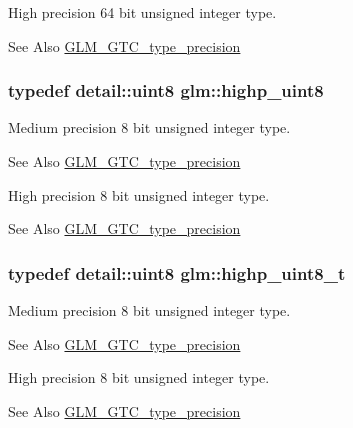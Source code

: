 High precision 64 bit unsigned integer type. \begin{DoxySeeAlso}{See Also}
\hyperlink{group__gtc__type__precision}{G\-L\-M\-\_\-\-G\-T\-C\-\_\-type\-\_\-precision} 
\end{DoxySeeAlso}
\hypertarget{group__gtc__type__precision_ga2c27c6dd26e893786f04b10f99c1ee95}{
\subsubsection[{highp\-\_\-uint8}]{\setlength{\rightskip}{0pt plus 5cm}typedef detail\-::uint8 {\bf glm\-::highp\-\_\-uint8}}}\label{group__gtc__type__precision_ga2c27c6dd26e893786f04b10f99c1ee95}
Medium precision 8 bit unsigned integer type. \begin{DoxySeeAlso}{See Also}
\hyperlink{group__gtc__type__precision}{G\-L\-M\-\_\-\-G\-T\-C\-\_\-type\-\_\-precision}
\end{DoxySeeAlso}
High precision 8 bit unsigned integer type. \begin{DoxySeeAlso}{See Also}
\hyperlink{group__gtc__type__precision}{G\-L\-M\-\_\-\-G\-T\-C\-\_\-type\-\_\-precision} 
\end{DoxySeeAlso}
\hypertarget{group__gtc__type__precision_ga9ba529fcc75b82d23da979f0ce6e4518}{
\subsubsection[{highp\-\_\-uint8\-\_\-t}]{\setlength{\rightskip}{0pt plus 5cm}typedef detail\-::uint8 {\bf glm\-::highp\-\_\-uint8\-\_\-t}}}\label{group__gtc__type__precision_ga9ba529fcc75b82d23da979f0ce6e4518}
Medium precision 8 bit unsigned integer type. \begin{DoxySeeAlso}{See Also}
\hyperlink{group__gtc__type__precision}{G\-L\-M\-\_\-\-G\-T\-C\-\_\-type\-\_\-precision}
\end{DoxySeeAlso}
High precision 8 bit unsigned integer type. \begin{DoxySeeAlso}{See Also}
\hyperlink{group__gtc__type__precision}{G\-L\-M\-\_\-\-G\-T\-C\-\_\-type\-\_\-precision} 
\end{DoxySeeAlso}
